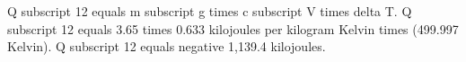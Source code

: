 Q subscript 12 equals m subscript g times c subscript V times delta T.  
Q subscript 12 equals 3.65 times 0.633 kilojoules per kilogram Kelvin times (499.997 Kelvin).  
Q subscript 12 equals negative 1,139.4 kilojoules.
